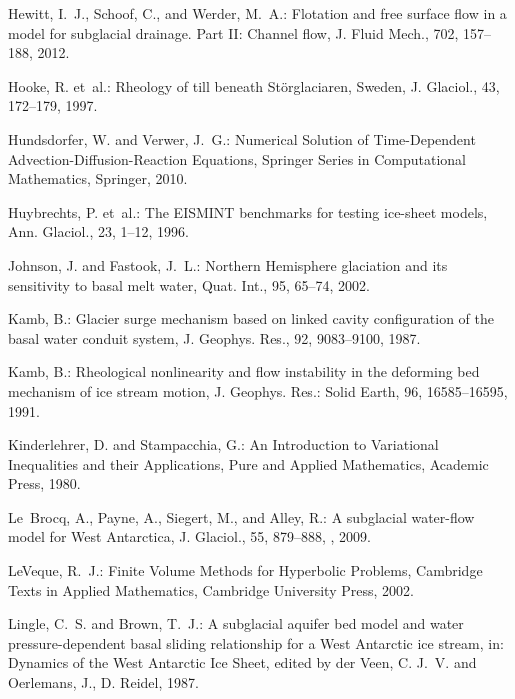 \documentclass[gmd]{copernicus}   %
\begin{document}
\begin{thebibliography}{67}
Hewitt, I.~J., Schoof, C., and Werder, M.~A.: Flotation and free surface flow
  in a model for subglacial drainage. {P}art {II}: {C}hannel flow, J. Fluid
  Mech., 702, 157--188, 2012.

Hooke, R. et~al.: Rheology of
  till beneath {S}t\"orglaciaren, {S}weden, J. Glaciol., 43, 172--179, 1997.

Hundsdorfer, W. and Verwer, J.~G.: Numerical {S}olution of {T}ime-{D}ependent
  {A}dvection-{D}iffusion-{R}eaction {E}quations, Springer Series in
  Computational Mathematics, Springer, 2010.

Huybrechts, P. et~al.: The {EISMINT} benchmarks for testing ice-sheet models,
  Ann. Glaciol., 23, 1--12, 1996.

Johnson, J. and Fastook, J.~L.: Northern {H}emisphere glaciation and its
  sensitivity to basal melt water, Quat. Int., 95, 65--74, 2002.

Kamb, B.: Glacier surge mechanism based on linked cavity configuration of the
  basal water conduit system, J. Geophys. Res., 92, 9083--9100, 1987.

Kamb, B.: Rheological nonlinearity and flow instability in the deforming bed
  mechanism of ice stream motion, J. Geophys. Res.: Solid Earth, 96, 16585--16595, 1991.

Kinderlehrer, D. and Stampacchia, G.: An {I}ntroduction to {V}ariational
  {I}nequalities and their {A}pplications, Pure and Applied Mathematics,
  Academic Press, 1980.

Le~Brocq, A., Payne, A., Siegert, M., and Alley, R.: A subglacial water-flow
  model for {W}est {A}ntarctica, J. Glaciol., 55, 879--888,
  , 2009.

LeVeque, R.~J.: Finite Volume Methods for Hyperbolic Problems, Cambridge Texts
  in Applied Mathematics, Cambridge University Press, 2002.

Lingle, C.~S. and Brown, T.~J.: A subglacial aquifer bed model and water
  pressure-dependent basal sliding relationship for a {W}est {A}ntarctic ice
  stream, in: Dynamics of the {W}est {A}ntarctic {I}ce {S}heet, edited by der
  Veen, C. J.~V. and Oerlemans, J., D. Reidel, 1987.


\end{thebibliography}
\end{document}

